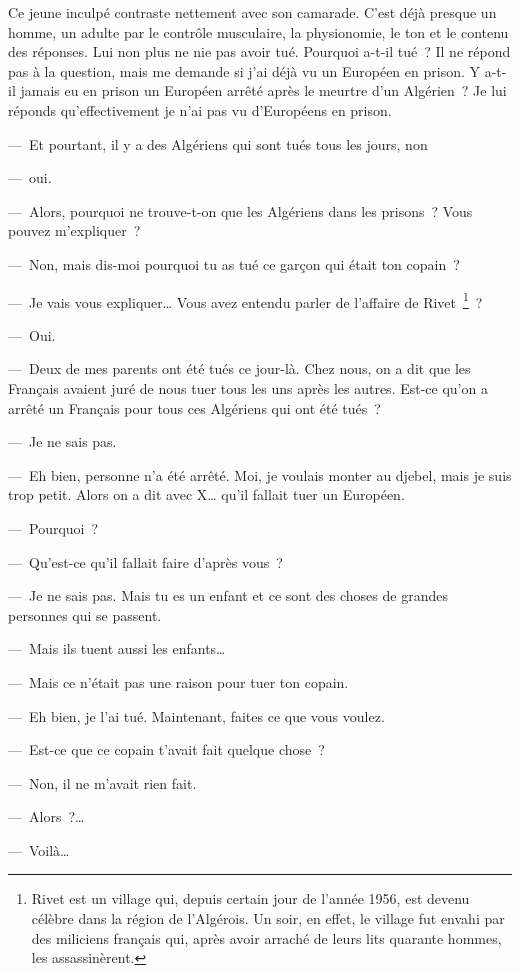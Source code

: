 \documentclass[french,twoside]{book} %
\begin{document}
\noindent Ce jeune inculpé contraste nettement avec son camarade. C’est déjà presque un homme, un adulte par le contrôle musculaire, la physionomie, le ton et le contenu des réponses. Lui non plus ne nie pas avoir tué. Pourquoi a-t-il tué ? Il ne répond pas à la question, mais me demande si j’ai déjà vu un Européen en prison. Y a-t-il jamais eu en prison un Européen arrêté après le meurtre d’un Algérien ? Je lui réponds qu’effectivement je n’ai pas vu d’Européens en prison.\par
— Et pourtant, il y a des Algériens qui sont tués tous les jours, non\par
— oui.\par
— Alors, pourquoi ne trouve-t-on que les Algériens dans les prisons ? Vous pouvez m’expliquer ?\par
— Non, mais dis-moi pourquoi tu as tué ce garçon qui était ton copain ?\par
 — Je vais vous expliquer… Vous avez entendu parler de l’affaire de Rivet \footnote{Rivet est un village qui, depuis certain jour de l’année 1956, est devenu célèbre dans la région de l’Algérois. Un soir, en effet, le village fut envahi par des miliciens français qui, après avoir arraché de leurs lits quarante hommes, les assassinèrent.} ?\par
— Oui.\par
— Deux de mes parents ont été tués ce jour-là. Chez nous, on a dit que les Français avaient juré de nous tuer tous les uns après les autres. Est-ce qu’on a arrêté un Français pour tous ces Algériens qui ont été tués ?\par
— Je ne sais pas.\par
— Eh bien, personne n’a été arrêté. Moi, je voulais monter au djebel, mais je suis trop petit. Alors on a dit avec X… qu’il fallait tuer un Européen.\par
— Pourquoi ?\par
— Qu’est-ce qu’il fallait faire d’après vous ?\par
— Je ne sais pas. Mais tu es un enfant et ce sont des choses de grandes personnes qui se passent.\par
— Mais ils tuent aussi les enfants…\par
— Mais ce n’était pas une raison pour tuer ton copain.\par
— Eh bien, je l’ai tué. Maintenant, faites ce que vous voulez.\par
— Est-ce que ce copain t’avait fait quelque chose ?\par
— Non, il ne m’avait rien fait.\par
— Alors ?…\par
— Voilà…
\end{document}

